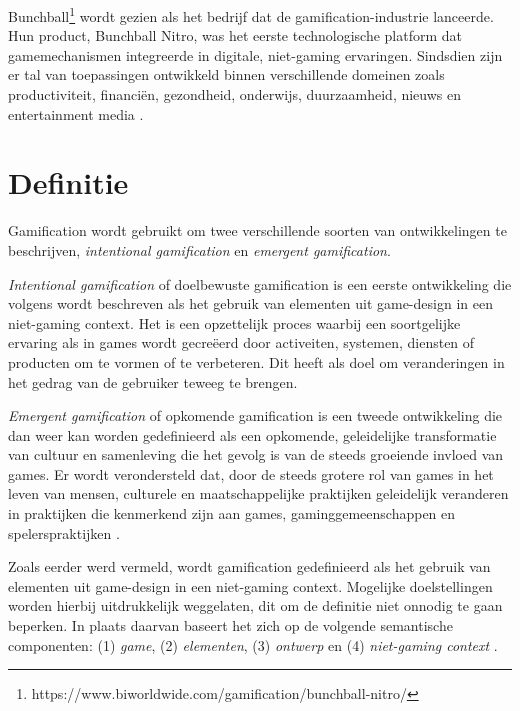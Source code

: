 Bunchball\footnote{https://www.biworldwide.com/gamification/bunchball-nitro/} wordt gezien als het bedrijf dat de gamification-industrie lanceerde. Hun product, Bunchball Nitro, was het eerste technologische platform dat gamemechanismen integreerde in digitale, niet-gaming ervaringen. Sindsdien zijn er tal van toepassingen ontwikkeld binnen verschillende domeinen zoals productiviteit, financiën, gezondheid, onderwijs, duurzaamheid, nieuws en entertainment media \autocite{Groh2012}.

\section{Definitie}

Gamification wordt gebruikt om twee verschillende soorten van ontwikkelingen te beschrijven, \textit{intentional gamification} en \textit{emergent gamification}.

\textit{Intentional gamification} of doelbewuste gamification is een eerste ontwikkeling die volgens \textcite{Deterding2011} wordt beschreven als het gebruik van elementen uit game-design in een niet-gaming context. Het is een opzettelijk proces waarbij een soortgelijke ervaring als in games wordt gecreëerd door activeiten, systemen, diensten of producten om te vormen of te verbeteren. Dit heeft als doel om veranderingen in het gedrag van de gebruiker teweeg te brengen.

\textit{Emergent gamification} of opkomende gamification is een tweede ontwikkeling die dan weer kan worden gedefinieerd als een opkomende, geleidelijke transformatie van cultuur en samenleving die het gevolg is van de steeds groeiende invloed van games. Er wordt verondersteld dat, door de steeds grotere rol van games in het leven van mensen, culturele en maatschappelijke praktijken geleidelijk veranderen in praktijken die kenmerkend zijn aan games, gaminggemeenschappen en spelerspraktijken  \autocite{Hamari2019}.

Zoals eerder werd vermeld, wordt gamification gedefinieerd als het gebruik van elementen uit game-design in een niet-gaming context. Mogelijke doelstellingen worden hierbij uitdrukkelijk weggelaten, dit om de definitie niet onnodig te gaan beperken. In plaats daarvan baseert het zich op de volgende semantische componenten: (1) \textit{game}, (2) \textit{elementen}, (3) \textit{ontwerp} en (4) \textit{niet-gaming context} \autocite{Sailer2016}.

